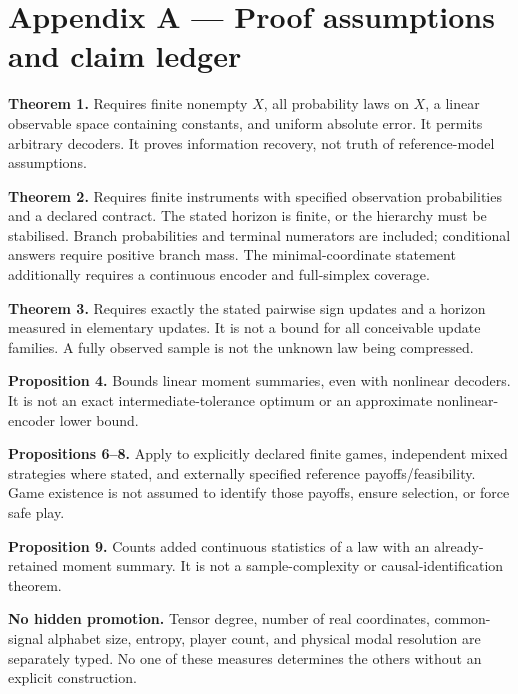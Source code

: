 \documentclass[11pt,a4paper]{article}
\begin{document}

\section*{Appendix A --- Proof assumptions and claim
ledger}\label{appendix-a-proof-assumptions-and-claim-ledger}


\textbf{Theorem 1.} Requires finite nonempty \(X\), all probability laws
on \(X\), a linear observable space containing constants, and uniform
absolute error. It permits arbitrary decoders. It proves information
recovery, not truth of reference-model assumptions.


\textbf{Theorem 2.} Requires finite instruments with specified
observation probabilities and a declared contract. The stated horizon is
finite, or the hierarchy must be stabilised. Branch probabilities and
terminal numerators are included; conditional answers require positive
branch mass. The minimal-coordinate statement additionally requires a
continuous encoder and full-simplex coverage.


\textbf{Theorem 3.} Requires exactly the stated pairwise sign updates
and a horizon measured in elementary updates. It is not a bound for all
conceivable update families. A fully observed sample is not the unknown
law being compressed.


\textbf{Proposition 4.} Bounds linear moment summaries, even with
nonlinear decoders. It is not an exact intermediate-tolerance optimum or
an approximate nonlinear-encoder lower bound.

\textbf{Propositions 6--8.} Apply to explicitly declared finite games,
independent mixed strategies where stated, and externally specified
reference payoffs/feasibility. Game existence is not assumed to identify
those payoffs, ensure selection, or force safe play.


\textbf{Proposition 9.} Counts added continuous statistics of a law with
an already-retained moment summary. It is not a sample-complexity or
causal-identification theorem.

\textbf{No hidden promotion.} Tensor degree, number of real coordinates,
common-signal alphabet size, entropy, player count, and physical modal
resolution are separately typed. No one of these measures determines the
others without an explicit construction.
\end{document}
